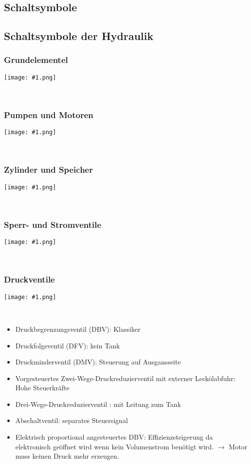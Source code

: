 \documentclass[landscape,a4paper,10pt]{article}
\newcommand{\graphiccol}[1]{
\noindent
\begin{minipage}{\columnwidth}
\centering
\texttt{[image: \#1.png]}
\end{minipage}
\medskip \\
}
\begin{document}
\begin{multicols*}{3}
\section{Schaltsymbole}
\subsection{Schaltsymbole der Hydraulik}
\subsubsection{Grundelementel}
\graphiccol{Schaltsymbole_Hydraulik_1_Grundelemente}
\subsubsection{Pumpen und Motoren}
\graphiccol{Schaltsymbole_Hydraulik_2_Pumpen_und_Motoren}
\subsubsection{Zylinder und Speicher}
\graphiccol{Schaltsymbole_Hydraulik_3}
\subsubsection{Sperr- und Stromventile}
\graphiccol{Schaltsymbole_Hydraulik_5_Sperr_und_Stromventile}
\subsubsection{Druckventile}
\graphiccol{Schaltsymbole_Hydraulik_4_Druckventile}
\begin{itemize}
\item Druckbegrenzungsventil (DBV): Klassiker
\item Druckfolgeventil (DFV):  kein Tank 
\item Druckminderventil (DMV):  Steuerung auf Ausgansseite
\item Vorgesteuertes Zwei-Wege-Druckreduzierventil mit externer Leckölabfuhr:  Hohe Steuerkräfte
\item Drei-Wege-Druckreduzierventil : mit Leitung zum Tank
\item Abschaltventil: separates Steuersignal 
\item Elektrisch proportional angesteuertes DBV: Effizienzsteigerung da elektronisch geöffnet wird wenn kein  Volumenstrom benötigt wird. $\to$ Motor muss keinen Druck mehr erzeugen.
\end{itemize}

\end{multicols*}
\end{document}
